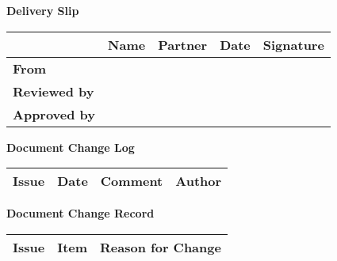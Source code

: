 \begin{center}
{\bf Delivery Slip}
\end{center}
\begin{tabularx}{\textwidth}{|l|l|l|X|X|}
\hline
           & {\bf Name} & {\bf Partner} & {\bf Date} & {\bf Signature} \\
\hline
{\bf From} &                  &  & & \\
\hline
{\bf Reviewed by} & &  & & \\

\hline
{\bf Approved by} & & & & \\
\hline
\end{tabularx}

\begin{center}
{\bf Document Change Log}
\end{center}

\begin{tabularx}{\textwidth}{|l|l|X|X|}
\hline
{\bf Issue } & {\bf Date  } & {\bf Comment } & {\bf Author  } \\   \hline

\hline
\end{tabularx}

\begin{center}
{\bf Document Change Record}
\end{center}

\begin{tabularx}{\textwidth}{|l|l|X|}
\hline
{\bf Issue } & {\bf Item  } & {\bf Reason for Change } \\   \hline

\hline
\end{tabularx}


\clearpage
